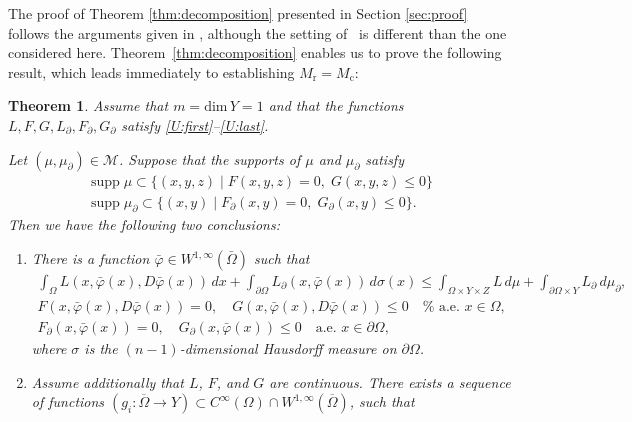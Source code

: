 \documentclass{article}
\newtheorem{theorem}{Theorem}[section]
\theoremstyle{definition}
\theoremstyle{remark}
\begin{document}
The proof of Theorem \ref{thm:decomposition} presented in Section \ref{sec:proof} follows the arguments given in  \cite{zworski1988decomposition}, although the setting of~\cite{zworski1988decomposition} is different than the one considered here.  Theorem~\ref{thm:decomposition} enables us to prove the following result, which leads immediately to establishing $M_\mathrm{r} = M_\mathrm{c}$:


\begin{theorem}\label{thm:consolidated}
 Assume that $m = \mathrm{dim}\,Y = 1$ and that the functions $L,F,G,L_\partial, F_\partial,G_\partial$ satisfy \ref{U:first}--\ref{U:last}.

%

 Let $(\mu,\mu_\partial)\in\mathcal M$.
Suppose that the supports of $\mu$ and $\mu_\partial$ satisfy
 \begin{gather}
  \label{eq:Fcond}
  \operatorname{supp}\mu\subset \{(x,y,z)\mid F(x,y,z) = 0, \;G(x,y,z) \le 0\}\\
%
  \label{eq:Gcond}
  \operatorname{supp}\mu_\partial \subset \{(x,y)\mid F_\partial(x,y) = 0,\; G_\partial(x,y) \le 0\}.
 \end{gather}
%
%
%
%
%
%
%
%
 Then we have the following two conclusions:
 \begin{enumerate}[label=\roman*.,ref=(\roman*)]
     \item \label{it:barphi} 
      There is a function $\bar\varphi\in W^{1,\infty}(\bar\Omega)$ such that 
     \begin{gather}\label{eq:barphiL1}
     \int_\Omega L(x,\bar\varphi(x),D\bar\varphi(x))\,dx+\int_{\partial\Omega} L_\partial(x,\bar\varphi(x))\,d\sigma(x)\leq \int_{\Omega\times Y\times Z} L\,d\mu+\int_{\partial\Omega\times Y} L_\partial\,d\mu_\partial,\\
     \label{eq:barphiF}
     F(x,\bar\varphi(x),D\bar\varphi(x))=0,\quad G(x,\bar\varphi(x),D\bar\varphi(x))\le 0\quad\textrm{
      a.e. 
      $x\in\Omega$},\\
     \label{eq:barphiG}
     F_\partial(x,\bar\varphi(x))=0,\quad G_\partial(x,\bar\varphi(x))\leq 0\quad\text{a.e. }
     \textrm{$x\in\partial\Omega$,} %
     \end{gather}
     where $\sigma$ is the $(n-1)$-dimensional Hausdorff measure on $\partial\Omega$.
     \item \label{it:gi} 
     Assume additionally that $L$, $F$, and $G$ are continuous.
     There exists a sequence of functions $(g_i\colon\overline \Omega \to Y)\subset C^\infty(\Omega)\cap W^{1,\infty}(\overline\Omega)$, such that

\end{enumerate}
\end{theorem}
\end{document}
